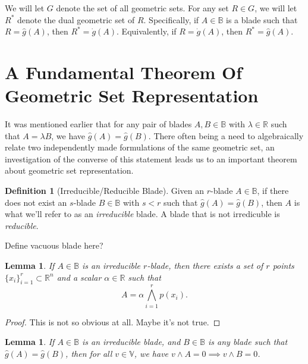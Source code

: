 \documentclass{birkjour}
\newtheorem{lem}[thm]{Lemma}
\theoremstyle{definition}
\newtheorem{defn}[thm]{Definition}
\theoremstyle{remark}
\numberwithin{equation}{section}
\newcommand{\R}{\mathbb{R}}
\newcommand{\B}{\mathbb{B}}
\newcommand{\V}{\mathbb{V}}
\newcommand{\gd}{\dot{g}}
\newcommand{\gh}{\hat{g}}
\begin{document}
We will let $G$ denote the set of all geometric sets.  For any set $R\in G$, we will let $R^*$ denote the dual geometric
set of $R$.  Specifically, if $A\in\B$ is a blade such that $R=\gh(A)$, then $R^*=\gd(A)$.  Equivalently, if $R=\gd(A)$, then $R^*=\gh(A)$.

\section{A Fundamental Theorem Of Geometric Set Representation}


It was mentioned earlier that for any pair of blades $A,B\in\B$ with $\lambda\in\R$ such that $A=\lambda B$, we have
$\gh(A)=\gh(B)$.  There often being a need to algebraically relate two independently made formulations of the same geometric
set, an investigation of the converse of this statement leads us to an important theorem about
geometric set representation.

\begin{defn}[Irreducible/Reducible Blade]
Given an $r$-blade $A\in\B$, if there does not exist an $s$-blade $B\in\B$ with $s<r$ such
that $\gh(A)=\gh(B)$, then $A$ is what we'll refer to as an {\it irreducible} blade.  A blade that is
not irredicuble is {\it reducible}.
\end{defn}

Define vacuous blade here?

\begin{lem}
If $A\in\B$ is an irreducible $r$-blade, then there exists a set of $r$ points $\{x_i\}_{i=1}^r\subset\R^n$
and a scalar $\alpha\in\R$ such that
\begin{equation*}
A = \alpha\bigwedge_{i=1}^r p(x_i).
\end{equation*}
\end{lem}
\begin{proof}
This is not so obvious at all.  Maybe it's not true.
\end{proof}

\begin{lem}
If $A\in\B$ is an irreducible blade, and $B\in\B$ is any blade such that $\gh(A)=\gh(B)$, then
for all $v\in\V$, we have $v\wedge A=0\implies v\wedge B=0$.
\end{lem}
\end{document}
